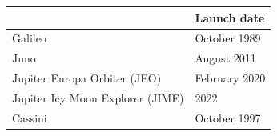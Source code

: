 













\begin{tabular}{p{}p{}}
  & Launch date \\
  \hline
  Galileo & October 1989 \\
  Juno & August 2011 \\
  Jupiter Europa Orbiter (JEO) & February 2020 \\
  Jupiter Icy Moon Explorer (JIME) & 2022 \\
  Cassini & October 1997 \\
\end{tabular}

